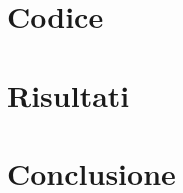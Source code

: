 \documentclass{article}
\begin{document}
\section{Codice}
\section{Risultati}
\section{Conclusione}





\end{document}
